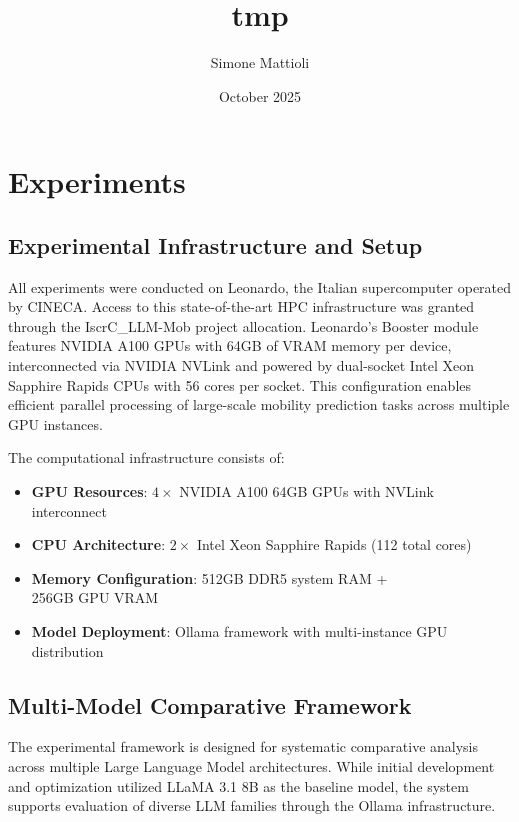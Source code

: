 \documentclass{article}
\title{tmp}
\author{Simone Mattioli}
\date{October 2025}
\begin{document}
\maketitle

\section{Experiments}

\subsection{Experimental Infrastructure and Setup}

All experiments were conducted on Leonardo, the Italian supercomputer operated by CINECA. Access to this state-of-the-art HPC infrastructure was granted through the IscrC\_LLM-Mob project allocation. Leonardo's Booster module features NVIDIA A100 GPUs with 64GB of VRAM memory per device, interconnected via NVIDIA NVLink and powered by dual-socket Intel Xeon Sapphire Rapids CPUs with 56 cores per socket. This configuration enables efficient parallel processing of large-scale mobility prediction tasks across multiple GPU instances.

The computational infrastructure consists of:
\begin{itemize}
    \item \textbf{GPU Resources}: $4 \times$ NVIDIA A100 64GB GPUs with NVLink interconnect
    \item \textbf{CPU Architecture}: $2 \times$ Intel Xeon Sapphire Rapids (112 total cores)
    \item \textbf{Memory Configuration}: 512GB DDR5 system RAM + \\ 256GB GPU VRAM
    \item \textbf{Model Deployment}: Ollama framework with multi-instance GPU distribution
\end{itemize}

\subsection{Multi-Model Comparative Framework}

The experimental framework is designed for systematic comparative analysis across multiple Large Language Model architectures. While initial development and optimization utilized LLaMA 3.1 8B as the baseline model, the system supports evaluation of diverse LLM families through the Ollama infrastructure.
\end{document}
